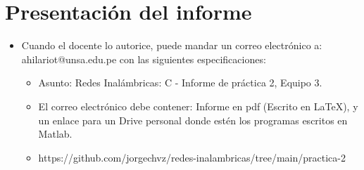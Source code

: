 \documentclass[letterpaper,12pt,oneside]{article}
\begin{document}
\section{Presentación del informe}
\begin{itemize}
    \item Cuando el docente lo autorice, puede mandar un correo electrónico a: ahilariot@unsa.edu.pe con las siguientes especificaciones:
    \begin{itemize}
        \item Asunto: Redes Inalámbricas: C - Informe de práctica 2, Equipo 3.
        \item El correo electrónico debe contener: Informe en pdf (Escrito en \LaTeX), y un enlace para un Drive personal donde estén los programas escritos en Matlab.
        \item https://github.com/jorgechvz/redes-inalambricas/tree/main/practica-2
    \end{itemize}
\end{itemize}
\end{document}
